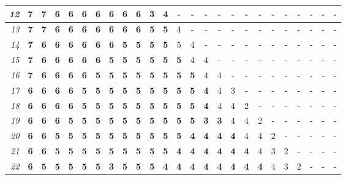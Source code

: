 \documentclass[12pt,landscape]{article}
\begin{document}
\begin{center}
\begin{tabular}{c|c|c|c|c|c|c|c|c|c|c|c|c|c|c|c|c|c|c|c|c|c|c|c|c|}
\multicolumn{1}{|r||}{\it 12} & {\bf 7} & {\bf 7} & {\bf 6} & {\bf 6} & {\bf 6} & {\bf 6} & {\bf 6} & {\bf 6} & {\bf 6} & {\bf 3} & 4 & - & - & - & - & - & - & - & - & - & - & - & - & - \\ \hline
\multicolumn{1}{|r||}{\it 13} & {\bf 7} & {\bf 7} & {\bf 6} & {\bf 6} & {\bf 6} & {\bf 6} & {\bf 6} & {\bf 6} & {\bf 6} & {\bf 5} & {\bf 5} & 4 & - & - & - & - & - & - & - & - & - & - & - & - \\ \hline
\multicolumn{1}{|r||}{\it 14} & {\bf 7} & {\bf 6} & {\bf 6} & {\bf 6} & {\bf 6} & {\bf 6} & {\bf 6} & {\bf 5} & {\bf 5} & {\bf 5} & {\bf 5} & 5 & 4 & - & - & - & - & - & - & - & - & - & - & - \\ \hline
\multicolumn{1}{|r||}{\it 15} & {\bf 7} & {\bf 6} & {\bf 6} & {\bf 6} & {\bf 6} & {\bf 6} & {\bf 5} & {\bf 5} & {\bf 5} & {\bf 5} & {\bf 5} & {\bf 5} & 4 & 4 & - & - & - & - & - & - & - & - & - & - \\ \hline
\multicolumn{1}{|r||}{\it 16} & {\bf 7} & {\bf 6} & {\bf 6} & {\bf 6} & {\bf 6} & {\bf 5} & {\bf 5} & {\bf 5} & {\bf 5} & {\bf 5} & {\bf 5} & {\bf 5} & {\bf 5} & 4 & 4 & - & - & - & - & - & - & - & - & - \\ \hline
\multicolumn{1}{|r||}{\it 17} & {\bf 6} & {\bf 6} & {\bf 6} & {\bf 6} & {\bf 5} & {\bf 5} & {\bf 5} & {\bf 5} & {\bf 5} & {\bf 5} & {\bf 5} & {\bf 5} & {\bf 5} & {\bf 4} & 4 & 3 & - & - & - & - & - & - & - & - \\ \hline
\multicolumn{1}{|r||}{\it 18} & {\bf 6} & {\bf 6} & {\bf 6} & {\bf 6} & {\bf 5} & {\bf 5} & {\bf 5} & {\bf 5} & {\bf 5} & {\bf 5} & {\bf 5} & {\bf 5} & {\bf 5} & {\bf 4} & 4 & 4 & 2 & - & - & - & - & - & - & - \\ \hline
\multicolumn{1}{|r||}{\it 19} & {\bf 6} & {\bf 6} & {\bf 6} & {\bf 5} & {\bf 5} & {\bf 5} & {\bf 5} & {\bf 5} & {\bf 5} & {\bf 5} & {\bf 5} & {\bf 5} & {\bf 5} & {\bf 3} & {\bf 3} & 4 & 4 & 2 & - & - & - & - & - & - \\ \hline
\multicolumn{1}{|r||}{\it 20} & {\bf 6} & {\bf 6} & {\bf 5} & {\bf 5} & {\bf 5} & {\bf 5} & {\bf 5} & {\bf 5} & {\bf 5} & {\bf 5} & {\bf 5} & {\bf 5} & {\bf 4} & {\bf 4} & {\bf 4} & {\bf 4} & 4 & 4 & 2 & - & - & - & - & - \\ \hline
\multicolumn{1}{|r||}{\it 21} & {\bf 6} & {\bf 6} & {\bf 5} & {\bf 5} & {\bf 5} & {\bf 5} & {\bf 5} & {\bf 5} & {\bf 5} & {\bf 5} & {\bf 5} & {\bf 4} & {\bf 4} & {\bf 4} & {\bf 4} & {\bf 4} & {\bf 4} & 4 & 3 & 2 & - & - & - & - \\ \hline
\multicolumn{1}{|r||}{\it 22} & {\bf 6} & {\bf 5} & {\bf 5} & {\bf 5} & {\bf 5} & {\bf 5} & {\bf 3} & {\bf 5} & {\bf 5} & {\bf 5} & {\bf 4} & {\bf 4} & {\bf 4} & {\bf 4} & {\bf 4} & {\bf 4} & {\bf 4} & {\bf 4} & 4 & 3 & 2 & - & - & - \\ \hline

\end{tabular}
\end{center}
\end{document}
